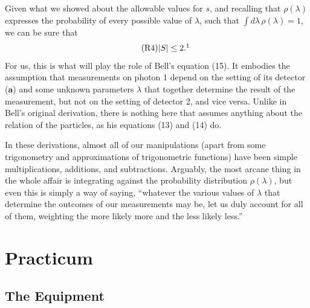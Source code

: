 Given what we showed about the allowable values for $s$, and recalling that $\rho(\lambda)$ expresses the
probability of every possible value of $\lambda$, such that $\int d\lambda\, \rho(\lambda) = 1$, we can
be sure that 
\begin{equation*}\tag{R4}
|S| \leq 2.\footnotemark
\end{equation*}
For us, this is what will play the role of Bell's equation (15). It embodies the assumption that measurements
on photon 1 depend on the setting of its detector ($\pmb{a}$) and some unknown parameters $\lambda$ that
together determine the result of the measurement, but not on the setting of detector 2, and vice versa. Unlike
in Bell's original derivation, there is nothing here that assumes anything about the relation of the
particles, as his equations (13) and (14) do. 

In these derivations, almost all of our manipulations (apart from some trigonometry and approximations of trigonometric functions) have been simple multiplications, additions, and subtractions. Arguably, the most arcane thing in the whole affair is integrating against the probability distribution $\rho(\lambda)$, but even this is simply a way of saying, ``whatever the various values of $\lambda$ that determine the outcomes of our measurements may be, let us duly account for all of them, weighting the more likely more and the less likely less.''


\section*{Practicum}

\subsection*{The Equipment}

